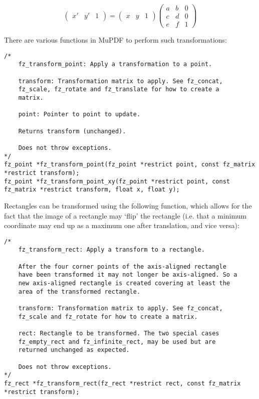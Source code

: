 \documentclass[oneside]{book}
\begin{document}
\[
\left(
\begin{array}{ccc}
x' & y' & 1
\end{array}
\right)
%
=
%
\left(
\begin{array}{ccc}
x & y & 1
\end{array}
\right)
%
\left(
\begin{array}{ccc}
a & b & 0 \\
c & d & 0 \\
e & f & 1
\end{array}
\right)
%
\]

There are various functions in MuPDF to perform such transformations:

\begin{lstlisting}
/*
	fz_transform_point: Apply a transformation to a point.

	transform: Transformation matrix to apply. See fz_concat,
	fz_scale, fz_rotate and fz_translate for how to create a
	matrix.

	point: Pointer to point to update.

	Returns transform (unchanged).

	Does not throw exceptions.
*/
fz_point *fz_transform_point(fz_point *restrict point, const fz_matrix *restrict transform);
fz_point *fz_transform_point_xy(fz_point *restrict point, const fz_matrix *restrict transform, float x, float y);
\end{lstlisting}

Rectangles can be transformed using the following function, which allows for the fact that the image of a rectangle may `flip' the rectangle (i.e. that a minimum coordinate may end up as a maximum one after translation, and vice versa):

\begin{lstlisting}
/*
	fz_transform_rect: Apply a transform to a rectangle.

	After the four corner points of the axis-aligned rectangle
	have been transformed it may not longer be axis-aligned. So a
	new axis-aligned rectangle is created covering at least the
	area of the transformed rectangle.

	transform: Transformation matrix to apply. See fz_concat,
	fz_scale and fz_rotate for how to create a matrix.

	rect: Rectangle to be transformed. The two special cases
	fz_empty_rect and fz_infinite_rect, may be used but are
	returned unchanged as expected.

	Does not throw exceptions.
*/
fz_rect *fz_transform_rect(fz_rect *restrict rect, const fz_matrix *restrict transform);
\end{lstlisting}
\end{document}
